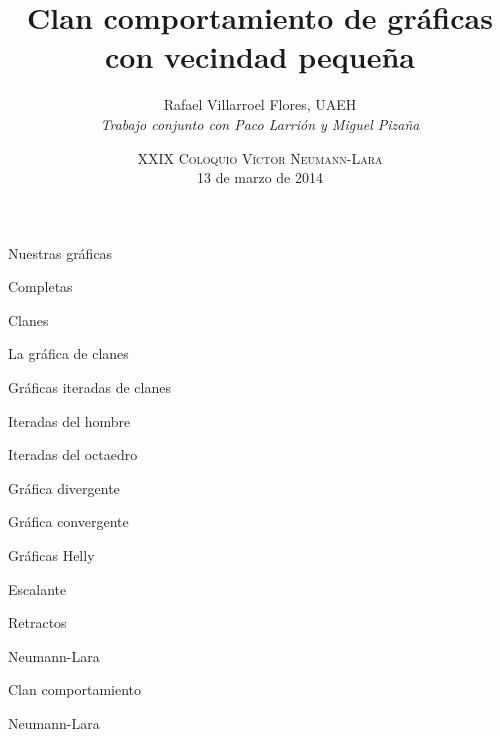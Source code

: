 \documentclass[spanish,mexico]{beamer}
\author{Rafael Villarroel Flores, UAEH\\[-0.5em]\scriptsize\textsl{Trabajo conjunto con Paco Larrión y Miguel Pizaña}}
\date{\textsc{\small XXIX Coloquio Víctor Neumann-Lara}\\[-0.5em] 13 de marzo de 2014}
\title{Clan comportamiento de gráficas con vecindad pequeña}
\begin{document}
\maketitle

\begin{frame}[label=sec-1]{Nuestras gráficas}

\end{frame}
\begin{frame}[label=sec-2]{Completas}

\end{frame}
\begin{frame}[label=sec-3]{Clanes}

\end{frame}
\begin{frame}[label=sec-4]{La gráfica de clanes}

\end{frame}
\begin{frame}[label=sec-5]{Gráficas iteradas de clanes}

\end{frame}
\begin{frame}[label=sec-6]{Iteradas del hombre}

\end{frame}
\begin{frame}[label=sec-7]{Iteradas del octaedro}

\end{frame}
\begin{frame}[label=sec-8]{Gráfica divergente}

\end{frame}
\begin{frame}[label=sec-9]{Gráfica convergente}

\end{frame}
\begin{frame}[label=sec-10]{Gráficas Helly}

\end{frame}
\begin{frame}[label=sec-11]{Escalante}

\end{frame}
\begin{frame}[label=sec-12]{Retractos}

\end{frame}
\begin{frame}[label=sec-13]{Neumann-Lara}

\end{frame}
\begin{frame}[label=sec-14]{Clan comportamiento}

\end{frame}
\begin{frame}[label=sec-15]{Neumann-Lara}

\end{frame}
\end{document}
